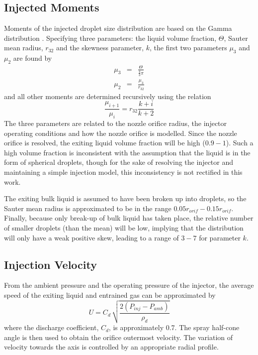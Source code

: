 \documentclass[a4paper,10pt]{article}
\begin{document}
\subsection{Injected Moments}
Moments of the injected droplet size distribution are based on the Gamma distribution \cite{yue2004}. Specifying three parameters: the liquid volume fraction, $\Theta$, Sauter mean radius, $r_{32}$ and the skewness parameter, $k$, the first two parameters $\mu_3$ and $\mu_2$ are found by
\begin{eqnarray}
\mu_3 &=& \frac{\Theta}{\frac{4}{3}\pi} \\
\mu_2 &=& \frac{\mu_3}{r_{32}}
\end{eqnarray}
and all other moments are determined recursively using the relation
\begin{equation}
\frac{\mu_{i+1}}{\mu_i} = r_{32} \frac{k+i}{k+2}
\end{equation}
The three parameters are related to the nozzle orifice radius, the injector operating conditions and how the nozzle orifice is modelled. Since the nozzle orifice is resolved, the exiting liquid volume fraction will be high ($0.9 - 1$). Such a high volume fraction is inconsistent with the assumption that the liquid is in the form of spherical droplets, though for the sake of resolving the injector and maintaining a simple injection model, this inconsistency is not rectified in this work.

The exiting bulk liquid is assumed to have been broken up into droplets, so the Sauter mean radius is approximated to be in the range $0.05r_{orif} - 0.15r_{orif}$. Finally, because only break-up of bulk liquid has taken place, the relative number of smaller droplets (than the mean) will be low, implying that the distribution will only have a weak positive skew, leading to a range of $3 - 7$ for parameter $k$.%



\subsection{Injection Velocity}
From the ambient pressure and the operating pressure of the injector, the average speed of the exiting liquid and entrained gas can be approximated by
\begin{equation}
U = C_d\,\sqrt{\frac{2(P_{inj}-P_{amb})}{\rho_d}}
\end{equation}
where the discharge coefficient, $C_d$, is approximately 0.7. The spray half-cone angle is then used to obtain the orifice outermost velocity. The variation of velocity towards the axis is controlled by an appropriate radial profile.
\end{document}
